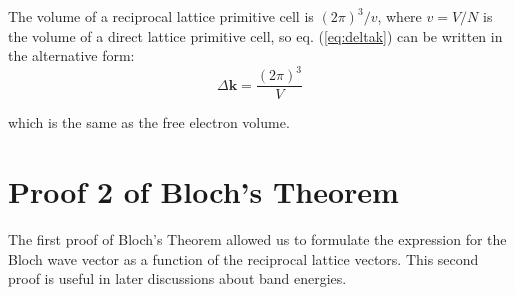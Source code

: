 	The volume of a reciprocal lattice primitive cell is $(2π)^3/v$, where $v=V/N$ is the volume of a direct lattice primitive cell, so eq. (\ref{eq:deltak}) can be written in the alternative form:
	\begin{equation} \label{eq:freedeltak}
		\Delta \boldsymbol{k}
		=
		\frac{(2 \pi)^3}{V}
	\end{equation}

	which is the same as the free electron volume.

\section{Proof 2 of Bloch's Theorem}
	The first proof of Bloch's Theorem allowed us to formulate the expression for the Bloch wave vector as a function of the reciprocal lattice vectors.  This second proof is useful in later discussions about band energies.














